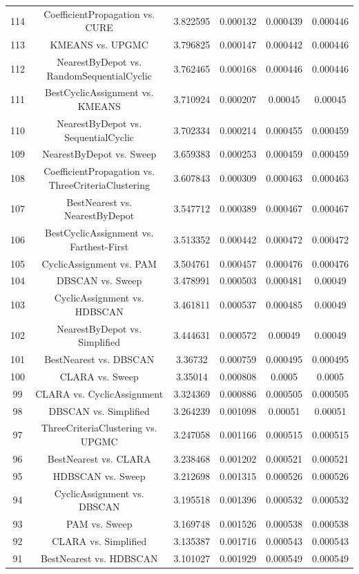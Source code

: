 \documentclass[a4paper,10pt]{article}
\begin{document}
\begin{landscape}
\begin{table}[!htp]
\begin{tabular}{cccccc}
114&CoefficientPropagation vs. CURE&3.822595&0.000132&0.000439&0.000446\\
113&KMEANS vs. UPGMC&3.796825&0.000147&0.000442&0.000446\\
112&NearestByDepot vs. RandomSequentialCyclic&3.762465&0.000168&0.000446&0.000446\\
111&BestCyclicAssignment vs. KMEANS&3.710924&0.000207&0.00045&0.00045\\
110&NearestByDepot vs. SequentialCyclic&3.702334&0.000214&0.000455&0.000459\\
109&NearestByDepot vs. Sweep&3.659383&0.000253&0.000459&0.000459\\
108&CoefficientPropagation vs. ThreeCriteriaClustering&3.607843&0.000309&0.000463&0.000463\\
107&BestNearest vs. NearestByDepot&3.547712&0.000389&0.000467&0.000467\\
106&BestCyclicAssignment vs. Farthest-First&3.513352&0.000442&0.000472&0.000472\\
105&CyclicAssignment vs. PAM&3.504761&0.000457&0.000476&0.000476\\
104&DBSCAN vs. Sweep&3.478991&0.000503&0.000481&0.00049\\
103&CyclicAssignment vs. HDBSCAN&3.461811&0.000537&0.000485&0.00049\\
102&NearestByDepot vs. Simplified&3.444631&0.000572&0.00049&0.00049\\
101&BestNearest vs. DBSCAN&3.36732&0.000759&0.000495&0.000495\\
100&CLARA vs. Sweep&3.35014&0.000808&0.0005&0.0005\\
99&CLARA vs. CyclicAssignment&3.324369&0.000886&0.000505&0.000505\\
98&DBSCAN vs. Simplified&3.264239&0.001098&0.00051&0.00051\\
97&ThreeCriteriaClustering vs. UPGMC&3.247058&0.001166&0.000515&0.000515\\
96&BestNearest vs. CLARA&3.238468&0.001202&0.000521&0.000521\\
95&HDBSCAN vs. Sweep&3.212698&0.001315&0.000526&0.000526\\
94&CyclicAssignment vs. DBSCAN&3.195518&0.001396&0.000532&0.000532\\
93&PAM vs. Sweep&3.169748&0.001526&0.000538&0.000538\\
92&CLARA vs. Simplified&3.135387&0.001716&0.000543&0.000543\\
91&BestNearest vs. HDBSCAN&3.101027&0.001929&0.000549&0.000549\\

\end{tabular}
\end{table}
\end{landscape}
\end{document}
